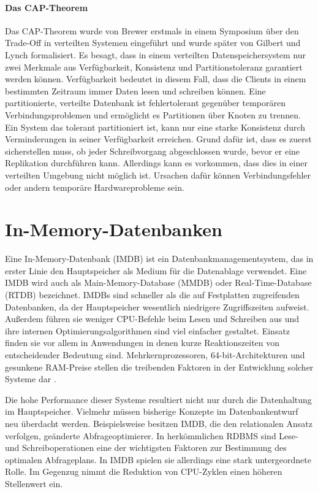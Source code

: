 \paragraph{Das CAP-Theorem} Das CAP-Theorem wurde von Brewer erstmals in einem Symposium \cite{cap2010} über den Trade-Off in verteilten Systemen eingeführt und wurde später von Gilbert und Lynch \cite{Gilbert:2002:BCF:564585.564601} formalisiert. Es besagt, dass in einem verteilten Datenspeichersystem nur zwei Merkmale aus Verfügbarkeit, Konsistenz und  Partitionstoleranz garantiert werden können. Verfügbarkeit bedeutet in diesem Fall, dass die Clients in einem bestimmten Zeitraum immer Daten lesen und schreiben können. Eine partitionierte, verteilte Datenbank ist fehlertolerant gegenüber temporären Verbindungsproblemen und ermöglicht es Partitionen über Knoten zu trennen. Ein System das tolerant partitioniert ist, kann nur eine starke Konsistenz durch Verminderungen in seiner Verfügbarkeit erreichen. Grund dafür ist, dass es zuerst sicherstellen muss, ob jeder Schreibvorgang abgeschlossen wurde, bevor er eine Replikation durchführen kann. Allerdings kann es vorkommen, dass dies in einer verteilten Umgebung nicht möglich ist. Ursachen dafür können Verbindungsfehler oder andern temporäre Hardwareprobleme sein.

\section{In-Memory-Datenbanken}
\label{ch:grundlagen:sec:InMemoryDatenbanken}

Eine In-Memory-Datenbank (IMDB) ist ein Datenbankmanagementsystem, das in erster Linie den Hauptspeicher als Medium für die Datenablage verwendet. Eine IMDB wird auch als Main-Memory-Database (MMDB) oder Real-Time-Database (RTDB) bezeichnet. IMDBs sind schneller als die auf Festplatten zugreifenden Datenbanken, da der Hauptspeicher wesentlich niedrigere Zugriffszeiten aufweist. Außerdem führen sie weniger CPU-Befehle beim Lesen und Schreiben aus und ihre internen Optimierungsalgorithmen sind viel einfacher gestaltet. Einsatz finden sie vor allem in Anwendungen in denen kurze Reaktionszeiten von entscheidender Bedeutung sind. Mehrkernprozessoren, 64-bit-Architekturen und gesunkene RAM-Preise stellen die treibenden Faktoren in der Entwicklung solcher Systeme dar \cite{SWB-381840476}.

Die hohe Performance dieser Systeme resultiert nicht nur durch die Datenhaltung im Hauptspeicher. Vielmehr müssen bisherige Konzepte im Datenbankentwurf neu überdacht werden. Beispielsweise besitzen IMDB, die den relationalen Ansatz verfolgen, geänderte Abfrageoptimierer. In herkömmlichen RDBMS sind Lese- und Schreiboperationen eine der wichtigsten Faktoren zur Bestimmung des optimalen Abfrageplans. In IMDB spielen sie allerdings eine stark untergeordnete Rolle. Im Gegenzug nimmt die Reduktion von CPU-Zyklen einen höheren Stellenwert ein.

